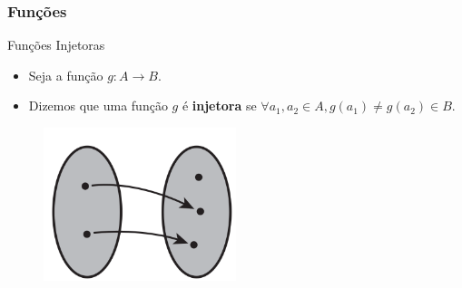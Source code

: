 \documentclass{beamer}
\begin{document}
\begin{frame}
\frametitle{Funções}

	\begin{block}{Funções Injetoras}
		\begin{itemize}
			\item Seja a função $g: A \to B$.
			\item<1-> Dizemos que uma função $g$ é \textbf{injetora} se $ \forall a_1,a_2 \in A, g(a_1) \neq g(a_2) \in B$.
		\end{itemize}
	\end{block}
	
	\begin{figure}[!h]
			\begin{center}
			\includegraphics[width=0.5\textwidth]{Figures/injetora}
			\end{center}
	\end{figure}	
	
\end{frame}

\end{document}
